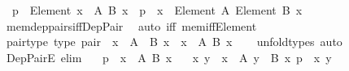 \begin{isabellebody}
\ \ {\isachardoublequoteopen}p\ {\isacharcolon}{\kern0pt}\ Element\ {\isacharparenleft}{\kern0pt}{\isasymSum}x\ {\isasymin}\ A{\isachardot}{\kern0pt}\ {\isacharparenleft}{\kern0pt}B\ x{\isacharparenright}{\kern0pt}{\isacharparenright}{\kern0pt}\ {\isasymlongleftrightarrow}\ p\ {\isacharcolon}{\kern0pt}\ {\isasymSum}x\ {\isacharcolon}{\kern0pt}\ Element\ A{\isachardot}{\kern0pt}\ {\isacharparenleft}{\kern0pt}Element\ {\isacharparenleft}{\kern0pt}B\ x{\isacharparenright}{\kern0pt}{\isacharparenright}{\kern0pt}{\isachardoublequoteclose}\isanewline
%
\isadelimproof
\ \ %
\endisadelimproof
%
\isatagproof
{}\isamarkupfalse%
\ mem{\isacharunderscore}{\kern0pt}dep{\isacharunderscore}{\kern0pt}pairs{\isacharunderscore}{\kern0pt}iff{\isacharunderscore}{\kern0pt}Dep{\isacharunderscore}{\kern0pt}Pair\ \isamarkupfalse%
\ {\isacharparenleft}{\kern0pt}auto\ iff{\isacharcolon}{\kern0pt}\ mem{\isacharunderscore}{\kern0pt}iff{\isacharunderscore}{\kern0pt}Element{\isacharparenright}{\kern0pt}%
\endisatagproof
{\isafoldproof}%
%
\isadelimproof
\isanewline
%
\endisadelimproof
\isanewline
{}\isamarkupfalse%
\ pair{\isacharunderscore}{\kern0pt}type\ {\isacharbrackleft}{\kern0pt}type{\isacharbrackright}{\kern0pt}{\isacharcolon}{\kern0pt}\ {\isachardoublequoteopen}pair\ {\isacharcolon}{\kern0pt}\ {\isacharparenleft}{\kern0pt}x\ {\isacharcolon}{\kern0pt}\ A{\isacharparenright}{\kern0pt}\ {\isasymRightarrow}\ B\ x\ {\isasymRightarrow}\ {\isasymSum}x\ {\isacharcolon}{\kern0pt}\ A{\isachardot}{\kern0pt}\ {\isacharparenleft}{\kern0pt}B\ x{\isacharparenright}{\kern0pt}{\isachardoublequoteclose}\isanewline
%
\isadelimproof
\ \ %
\endisadelimproof
%
\isatagproof
{}\isamarkupfalse%
\ unfold{\isacharunderscore}{\kern0pt}types\ auto%
\endisatagproof
{\isafoldproof}%
%
\isadelimproof
\isanewline
%
\endisadelimproof
\isanewline
{}\isamarkupfalse%
\ Dep{\isacharunderscore}{\kern0pt}PairE\ {\isacharbrackleft}{\kern0pt}elim{\isacharbang}{\kern0pt}{\isacharbrackright}{\kern0pt}{\isacharcolon}{\kern0pt}\isanewline
\ \ \ {\isachardoublequoteopen}p\ {\isacharcolon}{\kern0pt}\ {\isasymSum}x\ {\isacharcolon}{\kern0pt}\ A{\isachardot}{\kern0pt}\ {\isacharparenleft}{\kern0pt}B\ x{\isacharparenright}{\kern0pt}{\isachardoublequoteclose}\isanewline
\ \ \ x\ y\ \ {\isachardoublequoteopen}x\ {\isacharcolon}{\kern0pt}\ A{\isachardoublequoteclose}\ {\isachardoublequoteopen}y\ {\isacharcolon}{\kern0pt}\ B\ x{\isachardoublequoteclose}\ {\isachardoublequoteopen}p\ {\isacharequal}{\kern0pt}\ {\isasymlangle}x{\isacharcomma}{\kern0pt}\ y{\isasymrangle}{\isachardoublequoteclose}\isanewline

\end{isabellebody}
